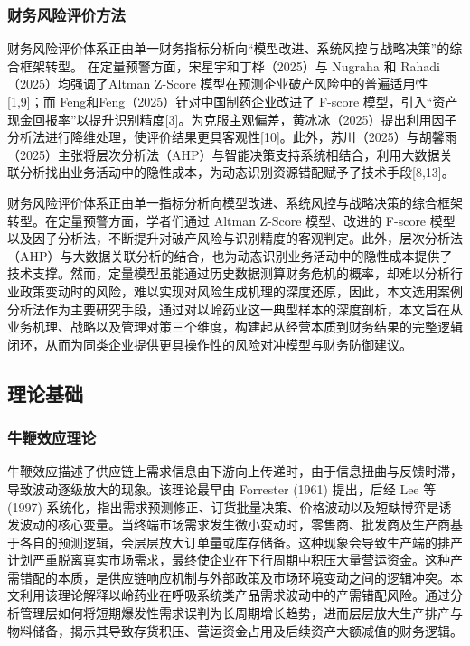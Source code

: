 \documentclass[12pt,a4paper,fontset=windows,UTF8]{ctexart}
\begin{document}
\subsubsection{财务风险评价方法}
财务风险评价体系正由单一财务指标分析向“模型改进、系统风控与战略决策”的综合框架转型。 在定量预警方面，宋星宇和丁桦（2025）与 Nugraha 和 Rahadi（2025）均强调了Altman Z-Score 模型在预测企业破产风险中的普遍适用性[1,9]；而 Feng和Feng（2025）针对中国制药企业改进了 F-score 模型，引入“资产现金回报率”以提升识别精度[3]。为克服主观偏差，黄冰冰（2025）提出利用因子分析法进行降维处理，使评价结果更具客观性[10]。此外，苏川（2025）与胡馨雨（2025）主张将层次分析法（AHP）与智能决策支持系统相结合，利用大数据关联分析找出业务活动中的隐性成本，为动态识别资源错配赋予了技术手段[8,13]。

财务风险评价体系正由单一指标分析向模型改进、系统风控与战略决策的综合框架转型。在定量预警方面，学者们通过 Altman Z-Score 模型、改进的 F-score 模型以及因子分析法，不断提升对破产风险与识别精度的客观判定。此外，层次分析法（AHP）与大数据关联分析的结合，也为动态识别业务活动中的隐性成本提供了技术支撑。然而，定量模型虽能通过历史数据测算财务危机的概率，却难以分析行业政策变动时的风险，难以实现对风险生成机理的深度还原，因此，本文选用案例分析法作为主要研究手段，通过对以岭药业这一典型样本的深度剖析，本文旨在从业务机理、战略以及管理对策三个维度，构建起从经营本质到财务结果的完整逻辑闭环，从而为同类企业提供更具操作性的风险对冲模型与财务防御建议。

\subsection{理论基础}
\subsubsection{牛鞭效应理论}
牛鞭效应描述了供应链上需求信息由下游向上传递时，由于信息扭曲与反馈时滞，导致波动逐级放大的现象。该理论最早由 Forrester (1961) 提出，后经 Lee 等 (1997) 系统化，指出需求预测修正、订货批量决策、价格波动以及短缺博弈是诱发波动的核心变量。当终端市场需求发生微小变动时，零售商、批发商及生产商基于各自的预测逻辑，会层层放大订单量或库存储备。这种现象会导致生产端的排产计划严重脱离真实市场需求，最终使企业在下行周期中积压大量营运资金。这种产需错配的本质，是供应链响应机制与外部政策及市场环境变动之间的逻辑冲突。本文利用该理论解释以岭药业在呼吸系统类产品需求波动中的产需错配风险。通过分析管理层如何将短期爆发性需求误判为长周期增长趋势，进而层层放大生产排产与物料储备，揭示其导致存货积压、营运资金占用及后续资产大额减值的财务逻辑。
\end{document}
